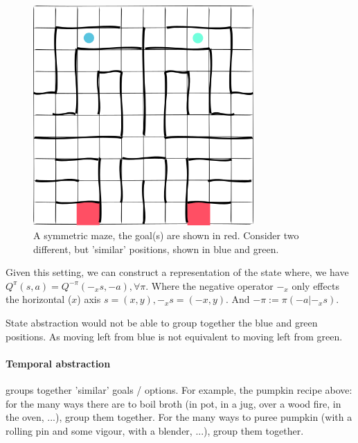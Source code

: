 \begin{figure}[h!]
\centering
\includegraphics[width=0.75\textwidth,height=0.3\textheight]{../../pictures/drawings/maze.png}
\caption{A symmetric maze, the goal(s) are shown in red.
Consider two different, but 'similar' positions, shown in blue and green.}
\end{figure}

Given this setting, we can construct a representation of the state \footnotemark[11] where,
we have $Q^{\pi}(s, a) = Q^{-\pi}(-_xs, -a), \forall \pi$.
Where the negative operator $-_x$ only effects the horizontal ($x$) axis $s = (x, y), -_xs = (-x, y)$.
And $-\pi := \pi(-a|-_xs)$. \footnotemark[21]



State abstraction would not be able to group together the blue and green positions.
As moving left from blue is not equivalent to moving left from green.

\paragraph{Temporal abstraction} groups together 'similar' goals / options.
For example, the pumpkin recipe above: for the many ways there are to boil broth
(in pot, in a jug, over a wood fire, in the oven, ...), group them together.
For the many ways to puree pumpkin (with a rolling pin and some vigour, with a blender, ...), group them together.

